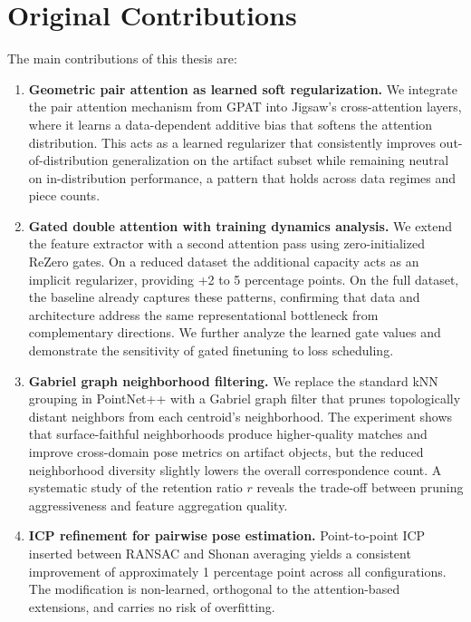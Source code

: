 \section{Original Contributions}

The main contributions of this thesis are:

\begin{enumerate}
    \item \textbf{Geometric pair attention as learned soft regularization.} We integrate the pair attention mechanism from GPAT into Jigsaw's cross-attention layers, where it learns a data-dependent additive bias that softens the attention distribution. This acts as a learned regularizer that consistently improves out-of-distribution generalization on the artifact subset while remaining neutral on in-distribution performance, a pattern that holds across data regimes and piece counts.

    \item \textbf{Gated double attention with training dynamics analysis.} We extend the feature extractor with a second attention pass using zero-initialized ReZero gates. On a reduced dataset the additional capacity acts as an implicit regularizer, providing +2 to 5 percentage points. On the full dataset, the baseline already captures these patterns, confirming that data and architecture address the same representational bottleneck from complementary directions. We further analyze the learned gate values and demonstrate the sensitivity of gated finetuning to loss scheduling.

    \item \textbf{Gabriel graph neighborhood filtering.} We replace the standard kNN grouping in PointNet++ with a Gabriel graph filter that prunes topologically distant neighbors from each centroid's neighborhood. The experiment shows that surface-faithful neighborhoods produce higher-quality matches and improve cross-domain pose metrics on artifact objects, but the reduced neighborhood diversity slightly lowers the overall correspondence count. A systematic study of the retention ratio $r$ reveals the trade-off between pruning aggressiveness and feature aggregation quality.

    \item \textbf{ICP refinement for pairwise pose estimation.} Point-to-point ICP inserted between RANSAC and Shonan averaging yields a consistent improvement of approximately 1 percentage point across all configurations. The modification is non-learned, orthogonal to the attention-based extensions, and carries no risk of overfitting.


\end{enumerate}
